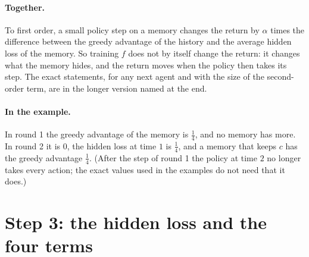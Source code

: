 \documentclass[11pt]{article}
\theoremstyle{definition}
\begin{document}
\paragraph{Together.} To first order, a small policy step on a memory changes the return by $\alpha$ times the difference between the greedy advantage of the history and the average hidden loss of the memory. So training $f$ does not by itself change the return: it changes what the memory hides, and the return moves when the policy then takes its step. The exact statements, for any next agent and with the size of the second-order term, are in the longer version named at the end.

\paragraph{In the example.} In round 1 the greedy advantage of the memory is $\tfrac14$, and no memory has more. In round 2 it is $0$, the hidden loss at time $1$ is $\tfrac14$, and a memory that keeps $c$ has the greedy advantage $\tfrac14$. (After the step of round 1 the policy at time $2$ no longer takes every action; the exact values used in the examples do not need that it does.)

\section{Step 3: the hidden loss and the four terms}
\end{document}
